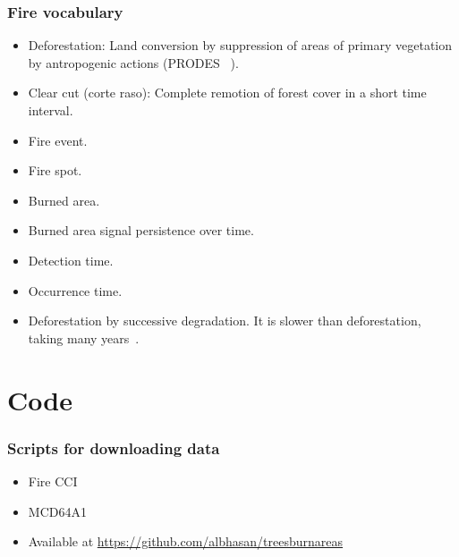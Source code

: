 \documentclass{beamer}
\begin{document}
\begin{frame}[t, allowframebreaks]
    \frametitle{Fire vocabulary}
    \begin{itemize}
        \item Deforestation: Land conversion by suppression of areas of 
            primary vegetation by antropogenic actions (PRODES
            ~\cite{dealmeida2022}). 
        \item Clear cut (corte raso): Complete remotion of forest cover in a 
            short time interval.
        \item Fire event.
        \item Fire spot.
        \item Burned area.
        \item Burned area signal persistence over time.
        \item Detection time.
        \item Occurrence time.
        \item Deforestation by successive degradation. It is slower than 
            deforestation, taking many years~\cite{dealmeida2022}.
    \end{itemize}
\end{frame}



\section{Code}

\begin{frame}
    \frametitle{Scripts for downloading data}
    \begin{itemize}
        \item Fire CCI
        \item MCD64A1
        \item Available at \url{https://github.com/albhasan/treesburnareas}
    \end{itemize}
\end{frame}
\end{document}
